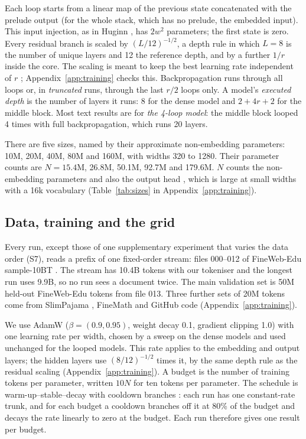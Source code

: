Each loop starts from a linear map of the previous state concatenated with the prelude output (for the whole stack,
which has no prelude, the embedded input). This input injection, as in Huginn \citep{geiping2025scaling}, has $2w^2$
parameters; the first state is zero. Every residual branch is scaled by $(L/12)^{-1/2}$, a depth rule in which $L = 8$ is the number of unique layers and 12
the reference depth, and by a further $1/r$ inside the core. The scaling is meant to keep the best learning rate
independent of $r$ \citep{wang2026residual}; Appendix~\ref{app:training} checks this. Backpropagation runs through all
loops or, in \emph{truncated} runs, through the last $r/2$ loops only. A model's \emph{executed depth} is the number of
layers it runs: 8 for the dense model and $2 + 4r + 2$ for the middle block. Most text results are for \emph{the 4-loop
model}: the middle block looped 4 times with full backpropagation, which runs 20 layers.

There are five sizes, named by their approximate non-embedding parameters: 10M, 20M, 40M, 80M and 160M, with widths 320
to 1280. Their parameter counts are $N = 15.4$M, 26.8M, 50.1M, 92.7M and 179.6M. $N$ counts the non-embedding parameters and
also the output head \citep{porian2024resolving}, which is large at small widths with a 16k vocabulary (Table~\ref{tab:sizes} in
Appendix~\ref{app:training}).

\subsection{Data, training and the grid}
\label{sec:grid}

Every run, except those of one supplementary experiment that varies the data order (S7), reads a prefix of one
fixed-order stream: files 000--012 of
FineWeb-Edu sample-10BT \citep{penedo2024fineweb}. The stream has 10.4B tokens with our tokeniser and the longest run uses
9.9B, so no run sees a document twice. The main validation set is 50M held-out FineWeb-Edu tokens from file 013. Three
further sets of 20M tokens come from SlimPajama \citep{soboleva2023slimpajama}, FineMath \citep{allal2025smollm2} and
GitHub code (Appendix~\ref{app:training}).

We use AdamW ($\beta = (0.9, 0.95)$, weight decay 0.1, gradient clipping 1.0) with one learning
rate per width, chosen by a sweep on the dense models and used unchanged for the looped models. This rate applies to the
embedding and output layers; the hidden layers use $(8/12)^{-1/2}$ times it, by the same depth rule as the residual
scaling (Appendix~\ref{app:training}). A budget is the number of training tokens per parameter, written $10N$ for ten tokens
per parameter. The schedule is warm-up--stable--decay with cooldown branches \citep{hagele2024scaling}: each run has
one constant-rate trunk, and for each budget a cooldown branches off it at 80\% of the budget and decays the rate
linearly to zero at the budget. Each run therefore gives one result per budget.

